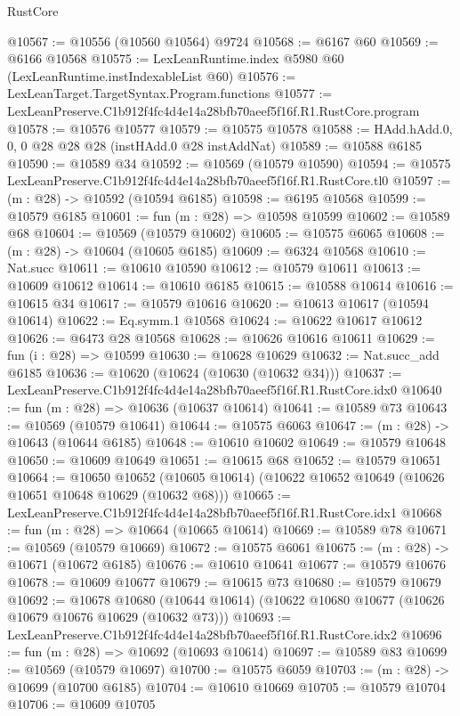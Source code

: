 \begin{lexlean}{RustCore}
\begin{coremodule}
@10567 := @10556 (@10560 @10564) @9724
@10568 := @6167 @60
@10569 := @6166 @10568
@10575 := LexLeanRuntime.index @5980 @60 (LexLeanRuntime.instIndexableList @60)
@10576 := LexLeanTarget.TargetSyntax.Program.functions
@10577 := LexLeanPreserve.C1b912f4fc4d4e14a28bfb70aeef5f16f.R1.RustCore.program
@10578 := @10576 @10577
@10579 := @10575 @10578
@10588 := HAdd.hAdd.{0, 0, 0} @28 @28 @28 (instHAdd.{0} @28 instAddNat)
@10589 := @10588 @6185
@10590 := @10589 @34
@10592 := @10569 (@10579 @10590)
@10594 := @10575 LexLeanPreserve.C1b912f4fc4d4e14a28bfb70aeef5f16f.R1.RustCore.tl0
@10597 := (m : @28) -> @10592 (@10594 @6185)
@10598 := @6195 @10568
@10599 := @10579 @6185
@10601 := fun (m : @28) => @10598 @10599
@10602 := @10589 @68
@10604 := @10569 (@10579 @10602)
@10605 := @10575 @6065
@10608 := (m : @28) -> @10604 (@10605 @6185)
@10609 := @6324 @10568
@10610 := Nat.succ
@10611 := @10610 @10590
@10612 := @10579 @10611
@10613 := @10609 @10612
@10614 := @10610 @6185
@10615 := @10588 @10614
@10616 := @10615 @34
@10617 := @10579 @10616
@10620 := @10613 @10617 (@10594 @10614)
@10622 := Eq.symm.{1} @10568
@10624 := @10622 @10617 @10612
@10626 := @6473 @28 @10568
@10628 := @10626 @10616 @10611
@10629 := fun (i : @28) => @10599
@10630 := @10628 @10629
@10632 := Nat.succ_add @6185
@10636 := @10620 (@10624 (@10630 (@10632 @34)))
@10637 := LexLeanPreserve.C1b912f4fc4d4e14a28bfb70aeef5f16f.R1.RustCore.idx0
@10640 := fun (m : @28) => @10636 (@10637 @10614)
@10641 := @10589 @73
@10643 := @10569 (@10579 @10641)
@10644 := @10575 @6063
@10647 := (m : @28) -> @10643 (@10644 @6185)
@10648 := @10610 @10602
@10649 := @10579 @10648
@10650 := @10609 @10649
@10651 := @10615 @68
@10652 := @10579 @10651
@10664 := @10650
    @10652
    (@10605 @10614)
    (@10622 @10652 @10649 (@10626 @10651 @10648 @10629 (@10632 @68)))
@10665 := LexLeanPreserve.C1b912f4fc4d4e14a28bfb70aeef5f16f.R1.RustCore.idx1
@10668 := fun (m : @28) => @10664 (@10665 @10614)
@10669 := @10589 @78
@10671 := @10569 (@10579 @10669)
@10672 := @10575 @6061
@10675 := (m : @28) -> @10671 (@10672 @6185)
@10676 := @10610 @10641
@10677 := @10579 @10676
@10678 := @10609 @10677
@10679 := @10615 @73
@10680 := @10579 @10679
@10692 := @10678
    @10680
    (@10644 @10614)
    (@10622 @10680 @10677 (@10626 @10679 @10676 @10629 (@10632 @73)))
@10693 := LexLeanPreserve.C1b912f4fc4d4e14a28bfb70aeef5f16f.R1.RustCore.idx2
@10696 := fun (m : @28) => @10692 (@10693 @10614)
@10697 := @10589 @83
@10699 := @10569 (@10579 @10697)
@10700 := @10575 @6059
@10703 := (m : @28) -> @10699 (@10700 @6185)
@10704 := @10610 @10669
@10705 := @10579 @10704
@10706 := @10609 @10705

\end{coremodule}
\end{lexlean}
